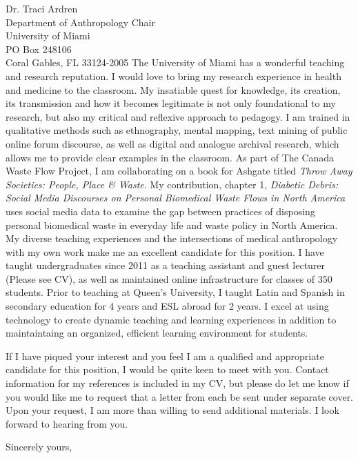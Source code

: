 \documentclass[10pt]{letter} %
\begin{document}
\begin{letter}{Dr. Traci Ardren \\
Department of Anthropology Chair \\
University of Miami \\
PO Box 248106 \\
Coral Gables, FL 33124-2005}
The University of Miami has a wonderful teaching and research reputation. I would love to bring my research experience in health and medicine to the classroom. My insatiable quest for knowledge, its creation, its transmission and how it becomes legitimate is not only foundational to my research, but also my critical and reflexive approach to pedagogy. I am trained in qualitative methods such as ethnography, mental mapping, text mining of public online forum discourse, as well as digital and analogue archival research, which allows me to provide clear examples in the classroom. As part of The Canada Waste Flow Project, I am collaborating on a book for Ashgate titled \textit{Throw Away Societies: People, Place \& Waste}. My contribution, chapter 1, \textit{Diabetic Debris: Social Media Discourses on Personal Biomedical Waste Flows in North America} uses social media data to examine the gap between practices of disposing personal biomedical waste in everyday life and waste policy in North America. My diverse teaching experiences and the intersections of medical anthropology with my own work make me an excellent candidate for this position. I have taught undergraduates since 2011 as a teaching assistant and guest lecturer (Please see CV), as well as maintained online infrastructure for classes of 350 students. Prior to teaching at Queen's University, I taught Latin and Spanish in secondary education for 4 years and ESL abroad for 2 years. I excel at using technology to create dynamic teaching and learning experiences in addition to maintaintaing an organized, efficient learning environment for students. 

If I have piqued your interest and you feel I am a qualified and appropriate candidate for this position, I would be quite keen to meet with you. Contact information for my references is included in my CV, but please do let me know if you would like me to request that a letter from each be sent under separate cover. Upon your request, I am more than willing to send additional materials. I look forward to hearing from you.

\closing{Sincerely yours,}




\end{letter}
\end{document}
